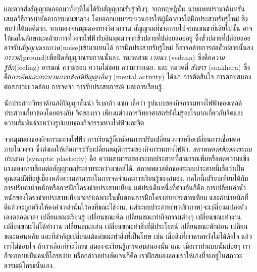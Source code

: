 {\begin{shaded}
และอาจส่งสัญญาณออกมาทั้งๆที่ไม่ได้รับสัญญาณรับรู้จริงๆ.
จากทฤษฎีนั้น นายแพทย์รามาฉันทรันเสนอวิธีการบำบัดอาการแขนขาลวง
โดยออกแบบกระบวนการให้ผู้มีอาการได้ฝึกประสาทรับรู้ใหม่ ซึ่งพบว่าได้ผลดีมาก.
หากมองจากมุมมองทางวิศวกรรม สัญญาณที่ขาดหายไปจากแขนขาที่เสียไปนั้น 
อาจให้ผลในลักษณะคล้ายการที่วงจรไฟฟ้ารับอินพุตมาจากขั้วปลายที่ปล่อยลอยอยู่
ซึ่งขั้วปลายที่ปล่อยลอยอาจรับ\textit{สัญญาณรบกวน}(noise)เข้ามาแทนได้ 
การฝึกประสาทรับรู้ใหม่ ก็อาจคล้ายการต่อขั้วปลายนั้นลง\textit{กราวด์}(ground)เพื่อปิดสัญญาณรบกวนนั้นลง.
หมวดสาม
\textit{เวทนา} (vedana) ซึ่งคือ\textit{ความรู้สึก}(feeling) อารมณ์ ความชอบ ความไม่ชอบ ความวางเฉย.
และ
หมวดสี่ 
\textit{สังขาร} (sankhara) ซึ่งคือ\textit{การคิดและกระบวนการเชิงสติปัญญาอื่นๆ} (mental activity) 
ได้แก่ การตัดสินใจ การตอบสนองต่อสภาวะแวดล้อม การจดจำ การรับประสบการณ์ และการเรียนรู้.

นักประสาทวิทยาด้านสติปัญญาชั้นนำ รีเบกก้า แซก\cite{Saxe2012a} เชื่อว่า
รูปแบบของกิจกรรมทางไฟฟ้าของเซลล์ประสาทเกี่ยวข้องโดยตรงกับ%
จิตของเรา
เพียงแต่วงการวิทยาศาสตร์ยังไม่รู้อะไรมากเกี่ยวกับจิตและความสัมพันธ์ระหว่างรูปแบบของกิจกรรมทางไฟฟ้าและจิต

จากมุมมองของกิจกรรมทางไฟฟ้า
การเรียนรู้ก็เหมือนการปรับเปลี่ยนวงจรหรือเปลี่ยนการเชื่อมต่อภายในวงจร ซึ่งส่งผลให้เกิดการปรับเปลี่ยนพฤติกรรมของกิจกรรมทางไฟฟ้า.
\textit{สภาพพลาสติกของระบบประสาท} (synaptic plasticity) คือ ความสามารถของระบบประสาทที่สามารถเพิ่มหรือลดความแข็งแรงของการเชื่อมต่อสัญญาณประสาทระหว่างเซลล์ได้.
สภาพพลาสติกของระบบประสาทนี้เชื่อว่าเป็นคุณสมบัติที่อยู่เบื้องหลังความสามารถในการจดจำและการเรียนรู้ของสมอง.
กลไกนี้เปรียบเทียบได้กับการปรับค่าน้ำหนักหรือการฝึกโครงข่ายประสาทเทียม
แต่ประเด็นหนึ่งที่ต่างกันก็คือ
การเปลี่ยนค่าน้ำหนักของโครงข่ายประสาทเทียมจะทำเฉพาะในขั้นตอนการฝึกโครงข่ายประสาทเทียม
และค่าน้ำหนักที่ดีแล้วจะถูกตรึงให้คงค่าเหล่านั้นไว้คงที่ขณะใช้งาน.
แต่ระบบประสาท(ทางชีวภาพ)จะเปลี่ยนแปลงตัวเองตลอดเวลา 
เปลี่ยนขณะเรียนรู้ เปลี่ยนขณะคิด เปลี่ยนขณะทำกิจกรรมต่างๆ เปลี่ยนขณะทำงาน เปลี่ยนขณะไม่ได้ทำงาน เปลี่ยนขณะเล่น เปลี่ยนขณะทำสิ่งที่มีประโยชน์ เปลี่ยนขณะพักผ่อน เปลี่ยนขณะนอนหลับ และที่สำคัญเปลี่ยนแม้แต่ขณะทำสิ่งที่เป็นโทษ เช่น เมื่อสิ่งที่เราคาดหวังไม่ได้ดั่งใจ แล้วเราไม่ชอบใจ ถ้าเราเลือกที่จะโกรธ สมองจะเรียนรู้การตอบสนองนั้น และ
เมื่อเราทำแบบนั้นบ่อยๆ เราก็จะกลายเป็นคนที่โกรธง่าย หรือกล่าวอย่างชัดเจนก็คือ เราฝึกสมองของเราให้เก่งที่จะอยู่ในสภาวะอารมณ์โกรธนั่นเอง.


\end{shaded}}
